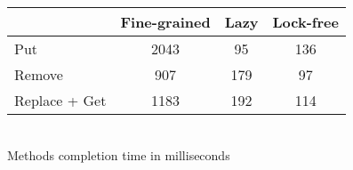 \documentclass[a4paper]{article}
\begin{document}
\begin{table}[!h]
	\begin{center}
		\begin{tabular}[c]{|l|c|c|c|}
			\hline
			& Fine-grained & Lazy & Lock-free \\
			\hline 
			Put & 2043 & 95 & 136 \\
			\hline
			Remove & 907 & 179 & 97 \\
			\hline
			Replace + Get & 1183 & 192 & 114 \\
			\hline
		\end{tabular}
	\\[0.5cm]
	Methods completion time in milliseconds
	\end{center}
\end{table}
\end{document}
